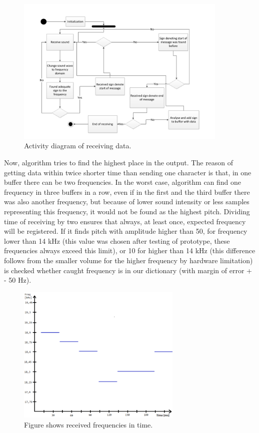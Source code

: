 \documentclass[11pt,titlepage]{article}
\theoremstyle{plain}
\begin{document}
\begin{figure}[H]
	\centering
	\includegraphics[width=0.9\textwidth]{img/Activity_diag_receiving.pdf}
	\caption{Activity diagram of receiving data.}
	\label{fig:F20}
\end{figure}


Now, algorithm tries to find the highest place in the output. The reason of getting data within twice shorter time than sending one character is that, in one buffer there can be two frequencies. In the worst case, algorithm can find one frequency in three buffers in a row, even if in the first and the third buffer there was also another frequency, but because of lower sound intensity or less samples representing this frequency, it would not be found as the highest pitch. Dividing time of receiving by two ensures that always, at least once, expected frequency will be registered. If it finds pitch with amplitude higher than 50, for frequency lower than 14 kHz (this value was chosen after testing of prototype, these frequencies always exceed this limit), or 10 for higher than 14 kHz (this difference follows from the smaller volume for the higher frequency by hardware limitation) is checked whether caught frequency is in our dictionary (with margin of error + - 50 Hz). 


\begin{figure}[H]
	\centering
	\includegraphics[width=0.70\textwidth]{img/receiving}
	\caption{Figure shows received frequencies in time.}
\end{figure}
\end{document}
